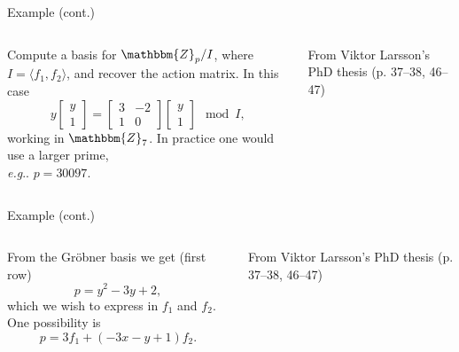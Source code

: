 \documentclass[aspectratio=169]{beamer}
\makeatletter
\newcommand{\Z}{\ensuremath{\mathbbm{Z}}}
\DeclareRobustCommand\eg{\emph{e.g}\@ifnextchar.{}{.\@}}
\makeatother
\begin{document}
\begin{frame}[t]{Example (cont.)}
\vspace{1cm}
\begin{columns}
    \begin{column}{0.7\textwidth}
        Compute a basis for $\Z_p/I$, where $I=\langle f_1,f_2\rangle$, and recover the action matrix. In this case
        \begin{equation*}
            y\begin{bmatrix}
                y \\ 1
            \end{bmatrix}
            =
            \begin{bmatrix}
                3 & -2 \\ 1 & 0
            \end{bmatrix}
            \begin{bmatrix}
                y \\ 1
            \end{bmatrix}
            {\mod I},
        \end{equation*}
        working in $\Z_7$. In practice one would use a larger prime,\\ \eg{} $p=30097$.
    \end{column}%
    \begin{column}{0.3\textwidth}
        \centering
        

        \vspace{5mm}

        {\scriptsize From Viktor Larsson's PhD thesis (p. 37--38, 46--47)}
    \end{column}
\end{columns}
\end{frame}

\begin{frame}[t]{Example (cont.)}
\vspace{1cm}
\begin{columns}
    \begin{column}{0.7\textwidth}
        From the Gröbner basis we get (first row)
        \begin{equation*}
            p = y^2-3y+2,
        \end{equation*}
        which we wish to express in $f_1$ and $f_2$. One possibility is
        \begin{equation*}
            p = 3f_1 + (-3x-y+1)f_2.
        \end{equation*}
    \end{column}%
    \begin{column}{0.3\textwidth}
        \centering
        

        \vspace{5mm}

        {\scriptsize From Viktor Larsson's PhD thesis (p. 37--38, 46--47)}
    \end{column}
\end{columns}
\end{frame}
\end{document}
